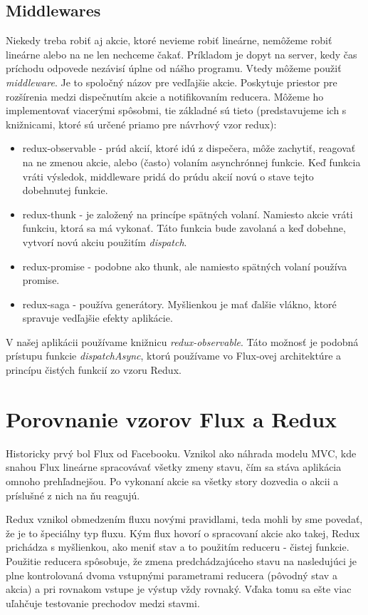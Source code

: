 \subsection{Middlewares}
\label{subsec:middlewares}
\NEW{}
Niekedy treba robiť aj akcie, ktoré nevieme robiť lineárne, nemôžeme robiť lineárne alebo na ne len nechceme čakať. Príkladom je dopyt na server, kedy čas príchodu odpovede nezávisí úplne od nášho programu. Vtedy môžeme použiť \emph{middleware}. Je to spoločný názov pre vedľajšie akcie. Poskytuje priestor pre rozšírenia medzi dispečnutím akcie a notifikovaním reducera. Môžeme ho implementovať viacerými spôsobmi, tie základné sú tieto (predstavujeme ich s knižnicami, ktoré sú určené priamo pre návrhový vzor redux):
\begin{itemize}
  \item redux-observable - prúd akcií, ktoré idú z dispečera, môže zachytiť, reagovať na ne zmenou akcie, alebo (často) volaním asynchrónnej funkcie. Keď funkcia vráti výsledok, middleware pridá do prúdu akcií novú o stave tejto dobehnutej funkcie.
  \item redux-thunk - je založený na princípe spätných volaní. Namiesto akcie vráti funkciu, ktorá sa má vykonať. Táto funkcia bude zavolaná a keď dobehne, vytvorí novú akciu použitím \emph{dispatch}.
  \item redux-promise - podobne ako thunk, ale namiesto spätných volaní používa promise.
  \item redux-saga - používa generátory. Myšlienkou je mať ďalšie vlákno, ktoré spravuje vedľajšie efekty aplikácie.
\end{itemize}

V našej aplikácii používame knižnicu \emph{redux-observable}. Táto možnosť je podobná prístupu funkcie \emph{dispatchAsync}, ktorú používame vo Flux-ovej architektúre a princípu čistých funkcií zo vzoru Redux. 







\section{Porovnanie vzorov Flux a Redux}
\NEW{}
Historicky prvý bol Flux od Facebooku. Vznikol ako náhrada modelu MVC, kde snahou Flux lineárne spracovávať všetky zmeny stavu, čím sa stáva aplikácia omnoho prehľadnejšou. Po vykonaní akcie sa všetky story dozvedia o akcii a príslušné z nich na ňu reagujú.

Redux vznikol obmedzením fluxu novými pravidlami, teda mohli by sme povedať, že je to špeciálny typ fluxu. Kým flux hovorí o spracovaní akcie ako takej, Redux prichádza s myšlienkou, ako meniť stav a to použitím reduceru - čistej funkcie. Použitie reducera spôsobuje, že zmena predchádzajúceho stavu na nasledujúci je plne kontrolovaná dvoma vstupnými parametrami reducera (pôvodný stav a akcia) a pri rovnakom vstupe je výstup vždy rovnaký. Vďaka tomu sa ešte viac uľahčuje testovanie prechodov medzi stavmi.

